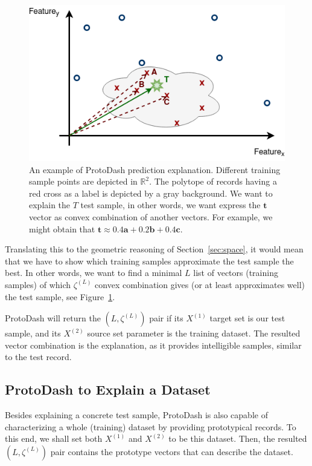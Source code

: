 \documentclass[output=paper,colorlinks,citecolor=brown
]{langscibook}
\begin{document}
\begin{figure}[h!]
    \includegraphics[width=.85\textwidth]{protodash1.png}
    \caption{An example of ProtoDash prediction explanation. Different training sample points are depicted in $\mathbb{R}^2$. The polytope of records having a red cross as a label is depicted by a gray background. We want to explain the $T$ test sample, in other words, we want express the $\mathbf{t}$ vector as convex combination of another vectors. For example, we might obtain that $\mathbf{t} \approx 0.4 \mathbf{a} + 0.2 \mathbf{b} + 0.4 \mathbf{c}$.}
    \label{fig:proto1}
\end{figure}

Translating this to the geometric reasoning of Section~\ref{sec:space}, it would mean that we have to show which training samples approximate the test sample the best. In other words, we want to find a minimal $L$ list of vectors (training samples) of which $\zeta^{(L)}$ convex combination gives (or at least approximates well) the test sample, see Figure~\ref{fig:proto1}.

ProtoDash will return the $(L, \zeta^{(L)})$ pair if its $X^{(1)}$ target set is our test sample, and its $X^{(2)}$ source set parameter is the training dataset. The resulted vector combination is the explanation, as it provides intelligible samples, similar to the test record. 

\subsection{ProtoDash to Explain a Dataset}
Besides explaining a concrete test sample, ProtoDash is also capable of characterizing a whole (training) dataset by providing prototypical records. To this end, we shall set both $X^{(1)}$ and $X^{(2)}$ to be this dataset. Then, the resulted $(L, \zeta^{(L)})$ pair contains the prototype vectors that can describe the dataset.
\end{document}
